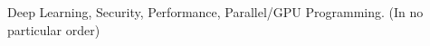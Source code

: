 

\begin{cvparagraph}

Deep Learning, Security, Performance, Parallel/GPU Programming.
(In no particular order)
\end{cvparagraph}
